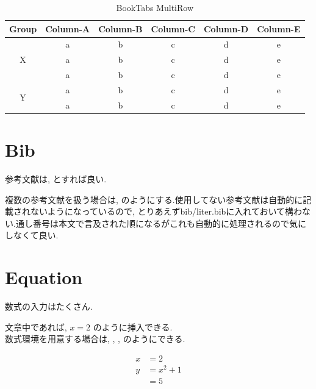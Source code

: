 \begin{table}
    \centering
    \caption{BookTabs MultiRow}
    \begin{tabular}{cccccc}
        \toprule
        Group              & Column-A & Column-B & Column-C & Column-D & Column-E \\
        \midrule
        \multirow{3}{*}{X} & a        & b        & c        & d        & e        \\
                           & a        & b        & c        & d        & e        \\
                           & a        & b        & c        & d        & e        \\
        \midrule
        \multirow{2}{*}{Y} & a        & b        & c        & d        & e        \\
                           & a        & b        & c        & d        & e        \\
        \bottomrule
    \end{tabular}
\end{table}

\section{Bib}
参考文献は, \cite{visAssessmentApproachesLogistics2016}とすれば良い.

複数の参考文献を扱う場合は, \cite{visAssessmentApproachesLogistics2016, aitallaStudyNewInstallation2017}のようにする.使用してない参考文献は自動的に記載されないようになっているので, とりあえずbib/liter.bibに入れておいて構わない.通し番号は本文で言及された順になるがこれも自動的に処理されるので気にしなくて良い\cite{aitallaStudyNewInstallation2017}.

\section{Equation}
数式の入力はたくさん.

文章中であれば, $x = 2$ のように挿入できる.\\
数式環境を用意する場合は, , , のようにできる.

\begin{align}
    x &= 2 \label{eq:sample1}\\
    y &= x^2 + 1 \label{eq:sample2}\\
      &= 5 \label{eq:sample3}
\end{align}
